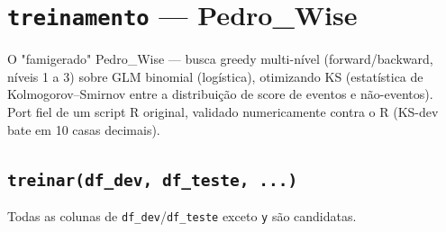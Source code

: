 \documentclass[11pt]{article}
\begin{document}
\section{\texttt{treinamento} --- Pedro\_Wise}

O "famigerado" Pedro\_Wise --- busca greedy multi-nível (forward/backward,
níveis 1 a 3) sobre GLM binomial (logística), otimizando KS (estatística de
Kolmogorov--Smirnov entre a distribuição de score de eventos e
não-eventos). Port fiel de um script R original, validado numericamente
contra o R (KS-dev bate em 10 casas decimais).

\subsection*{\texttt{treinar(df\_dev, df\_teste, ...)}}

Todas as colunas de \texttt{df\_dev}/\texttt{df\_teste} exceto \texttt{y}
são candidatas.
\end{document}
